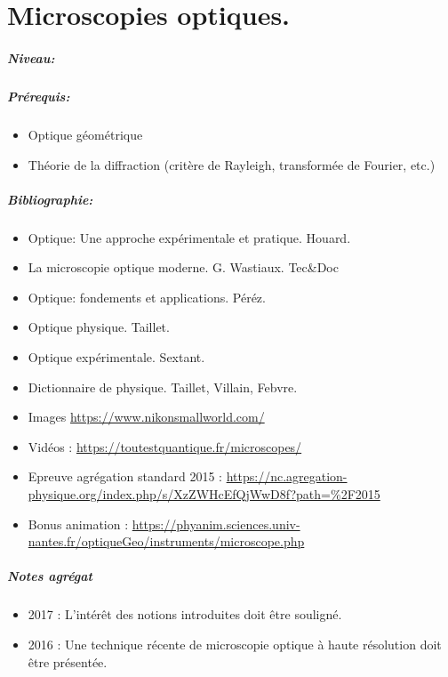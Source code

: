 \documentclass[11pt]{report}
\numberwithin{figure}{section}
\numberwithin{equation}{section}
\numberwithin{table}{section}
\newcommand{\1}{\boldsymbol{1}}
\begin{document}
\newpage



\chapter{Microscopies optiques.}


\paragraph*{Niveau:} 

\paragraph*{Prérequis:} 
\begin{itemize}
\item Optique géométrique
\item Théorie de la diffraction (critère de Rayleigh, transformée de Fourier, etc.)
\end{itemize}

\paragraph*{Bibliographie:}
\begin{itemize}
\item Optique: Une approche expérimentale et pratique. Houard.
\item La microscopie optique moderne. G. Wastiaux. Tec\&Doc
\item Optique: fondements et applications. Péréz.
\item Optique physique. Taillet.
\item Optique expérimentale. Sextant.
\item Dictionnaire de physique. Taillet, Villain, Febvre.
\item Images \url{https://www.nikonsmallworld.com/}
\item Vidéos : \url{https://toutestquantique.fr/microscopes/}
\item Epreuve agrégation standard 2015 : \url{https://nc.agregation-physique.org/index.php/s/XzZWHcEfQjWwD8f?path=%2F2015}
\item Bonus animation : \url{https://phyanim.sciences.univ-nantes.fr/optiqueGeo/instruments/microscope.php}
\end{itemize}

\paragraph{Notes agrégat}
\begin{itemize}
\item 2017 : L’intérêt des notions introduites doit être souligné.
\item 2016 : Une technique récente de microscopie optique à haute résolution doit être présentée.
\end{itemize}
\end{document}
